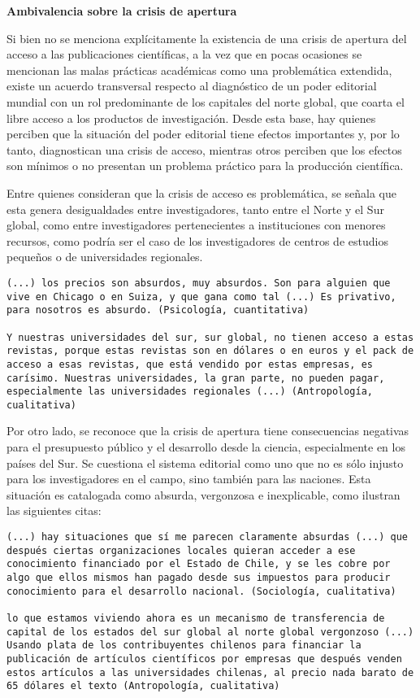 \documentclass[
  letterpaper,
  DIV=11,
  numbers=noendperiod]{scrreprt}
\begin{document}
\textbf{Ambivalencia sobre la crisis de apertura}

Si bien no se menciona explícitamente la existencia de una crisis de
apertura del acceso a las publicaciones científicas, a la vez que en
pocas ocasiones se mencionan las malas prácticas académicas como una
problemática extendida, existe un acuerdo transversal respecto al
diagnóstico de un poder editorial mundial con un rol predominante de los
capitales del norte global, que coarta el libre acceso a los productos
de investigación. Desde esta base, hay quienes perciben que la situación
del poder editorial tiene efectos importantes y, por lo tanto,
diagnostican una crisis de acceso, mientras otros perciben que los
efectos son mínimos o no presentan un problema práctico para la
producción científica.

Entre quienes consideran que la crisis de acceso es problemática, se
señala que esta genera desigualdades entre investigadores, tanto entre
el Norte y el Sur global, como entre investigadores pertenecientes a
instituciones con menores recursos, como podría ser el caso de los
investigadores de centros de estudios pequeños o de universidades
regionales.

\begin{verbatim}
(...) los precios son absurdos, muy absurdos. Son para alguien que vive en Chicago o en Suiza, y que gana como tal (...) Es privativo, para nosotros es absurdo. (Psicología, cuantitativa)

Y nuestras universidades del sur, sur global, no tienen acceso a estas revistas, porque estas revistas son en dólares o en euros y el pack de acceso a esas revistas, que está vendido por estas empresas, es carísimo. Nuestras universidades, la gran parte, no pueden pagar, especialmente las universidades regionales (...) (Antropología, cualitativa)
\end{verbatim}

Por otro lado, se reconoce que la crisis de apertura tiene consecuencias
negativas para el presupuesto público y el desarrollo desde la ciencia,
especialmente en los países del Sur. Se cuestiona el sistema editorial
como uno que no es sólo injusto para los investigadores en el campo,
sino también para las naciones. Esta situación es catalogada como
absurda, vergonzosa e inexplicable, como ilustran las siguientes citas:

\begin{verbatim}
(...) hay situaciones que sí me parecen claramente absurdas (...) que después ciertas organizaciones locales quieran acceder a ese conocimiento financiado por el Estado de Chile, y se les cobre por algo que ellos mismos han pagado desde sus impuestos para producir conocimiento para el desarrollo nacional. (Sociología, cualitativa)

lo que estamos viviendo ahora es un mecanismo de transferencia de capital de los estados del sur global al norte global vergonzoso (...) Usando plata de los contribuyentes chilenos para financiar la publicación de artículos científicos por empresas que después venden estos artículos a las universidades chilenas, al precio nada barato de 65 dólares el texto (Antropología, cualitativa)
\end{verbatim}
\end{document}
